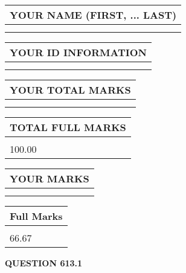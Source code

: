 \documentclass{ctexart}
\begin{document}
   
   
   
\newpage 
\setcounter{page}{ 
   613001 } 
   
   
   
   
\noindent\begin{tabular}{|l|}
\hline
YOUR NAME (FIRST, ... LAST)  \\
\hline
 \\ 
 \\ 
\hline
\end{tabular}
\hspace{0.05in} \begin{tabular}{|l|}
\hline
 YOUR   ID   INFORMATION  \\
\hline
 \\ 
 \\ 
\hline
\end{tabular}
   
   
\vspace{0.2in}\noindent\begin{tabular}{|l|}
\hline
YOUR TOTAL MARKS  \\
\hline
 \\ 
 \\ 
\hline
\end{tabular}
\hspace{0.05in} \begin{tabular}{|l|}
\hline
TOTAL FULL MARKS  \\
\hline
 \\ 
100.00 \\
\hline
\end{tabular}
   
   
 \vspace{0.2in}
 
 
 
 
   
   
  
\vspace{0.2in}
  
\noindent\begin{tabular}{|l|}
\hline
 YOUR MARKS  \\
\hline
 \\ 
 \\ 
\hline
\end{tabular}
\hspace{0.05in} \begin{tabular}{|l|}
\hline
 Full Marks  \\
\hline
 \\ 
66.67 \\
\hline
\end{tabular}
{\textbf{\Large{QUESTION
613.1 
}}}
  
\end{document}
